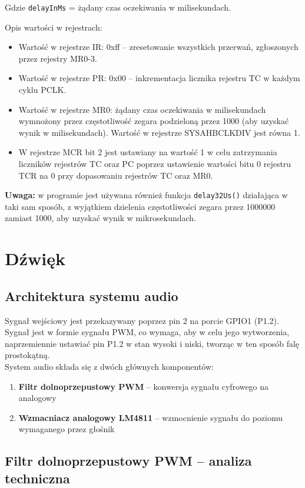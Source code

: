 \documentclass[letterpaper,11pt]{report}
\begin{document}
Gdzie \texttt{delayInMs} = żądany czas oczekiwania w milisekundach.

Opis wartości w rejestrach:
\begin{itemize}
    \item Wartość w rejestrze IR: 0xff – zresetowanie wszystkich przerwań, zgłoszonych przez rejestry MR0-3.
    \item Wartość w rejestrze PR: 0x00 – inkrementacja licznika rejestru TC w każdym cyklu PCLK.
    \item Wartość w rejestrze MR0: żądany czas oczekiwania w milisekundach wymnożony przez częstotliwość zegara podzieloną przez 1000 (aby uzyskać wynik w milisekundach). Wartość w rejestrze SYSAHBCLKDIV jest równa 1.
    \item W rejestrze MCR bit 2 jest ustawiany na wartość 1 w celu zatrzymania liczników rejestrów TC oraz PC poprzez ustawienie wartości bitu 0 rejestru TCR na 0 przy dopasowaniu rejestrów TC oraz MR0.
\end{itemize}

\textbf{Uwaga:} w programie jest używana również funkcja \texttt{delay32Us()} działająca w taki sam sposób, z wyjątkiem dzielenia częstotliwości zegara przez 1000000 zamiast 1000, aby uzyskać wynik w mikrosekundach.

\section{Dźwięk}

\subsection{Architektura systemu audio}
Sygnał wejściowy jest przekazywany poprzez pin 2 na porcie GPIO1 (P1.2). Sygnał jest w formie sygnału PWM, co wymaga, aby w celu jego wytworzenia, naprzemiennie ustawiać pin P1.2 w stan wysoki i niski, tworząc w ten sposób falę prostokątną.\\
System audio składa się z dwóch głównych komponentów:
\begin{enumerate}
    \item \textbf{Filtr dolnoprzepustowy PWM} -- konwersja sygnału cyfrowego na analogowy
    \item \textbf{Wzmacniacz analogowy LM4811} -- wzmocnienie sygnału do poziomu wymaganego przez głośnik
\end{enumerate}

\subsection{Filtr dolnoprzepustowy PWM -- analiza techniczna}
\end{document}
